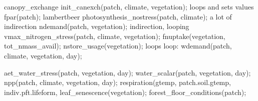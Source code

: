 canopy_exchange
  init_canexch(patch, climate, vegetation);
    loops and sets values
  fpar(patch);
    lambertbeer
  photosynthesis_nostress(patch, climate);
    a lot of indirection
  ndemand(patch, vegetation);
    indirection, looping
  vmax_nitrogen_stress(patch, climate, vegetation);
    fnuptake(vegetation, tot_nmass_avail);
    nstore_usage(vegetation);
    loops
  loop:
    wdemand(patch, climate, vegetation, day);

    aet_water_stress(patch, vegetation, day);
    water_scalar(patch, vegetation, day);
    npp(patch, climate, vegetation, day);
      respiration(gtemp, patch.soil.gtemp, indiv.pft.lifeform,
    leaf_senescence(vegetation);
  forest_floor_conditions(patch);
